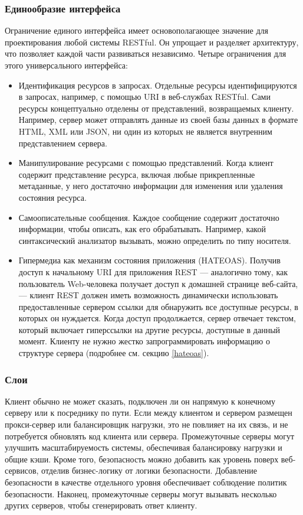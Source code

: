 \documentclass[a4page]{article}
\begin{document}
\subsubsection{Единообразие интерфейса}
Ограничение единого интерфейса имеет основополагающее значение для проектирования любой системы RESTful.
Он упрощает и разделяет архитектуру, что позволяет каждой части развиваться независимо.
Четыре ограничения для этого универсального интерфейса:

\begin{itemize}
	\item Идентификация ресурсов в запросах.
	      Отдельные ресурсы идентифицируются в запросах, например, с помощью URI в веб-службах RESTful.
	      Сами ресурсы концептуально отделены от представлений, возвращаемых клиенту.
	      Например, сервер может отправлять данные из своей базы данных в формате HTML,
	      XML или JSON, ни один из которых не является внутренним представлением сервера.
	\item Манипулирование ресурсами с помощью представлений.
	      Когда клиент содержит представление ресурса, включая любые прикрепленные метаданные,
	      у него достаточно информации для изменения или удаления состояния ресурса.
	\item Самоописательные сообщения.
	      Каждое сообщение содержит достаточно информации, чтобы описать, как его обрабатывать.
	      Например, какой синтаксический анализатор вызывать, можно определить по типу носителя.
	\item Гипермедиа как механизм состояния приложения (HATEOAS).
	      Получив доступ к начальному URI для приложения REST --- аналогично тому,
	      как пользователь Web-человека получает доступ к домашней странице веб-сайта, ---
	      клиент REST должен иметь возможность динамически использовать предоставленные сервером ссылки
	      для обнаружить все доступные ресурсы, в которых он нуждается.
	      Когда доступ продолжается, сервер отвечает текстом, который включает гиперссылки на другие ресурсы,
	      доступные в данный момент. Клиенту не нужно жестко запрограммировать информацию о структуре сервера
	      (подробнее см. секцию \ref{hateoas}).
\end{itemize}

\subsubsection{Слои}
Клиент обычно не может сказать, подключен ли он напрямую к конечному серверу или к посреднику по пути.
Если между клиентом и сервером размещен прокси-сервер или балансировщик нагрузки,
это не повлияет на их связь, и не потребуется обновлять код клиента или сервера.
Промежуточные серверы могут улучшить масштабируемость системы,
обеспечивая балансировку нагрузки и общие кэши.
Кроме того, безопасность можно добавить как уровень поверх веб-сервисов,
отделив бизнес-логику от логики безопасности.
Добавление безопасности в качестве отдельного уровня обеспечивает соблюдение политик безопасности.
Наконец, промежуточные серверы могут вызывать несколько других серверов, чтобы сгенерировать ответ клиенту.
\end{document}
